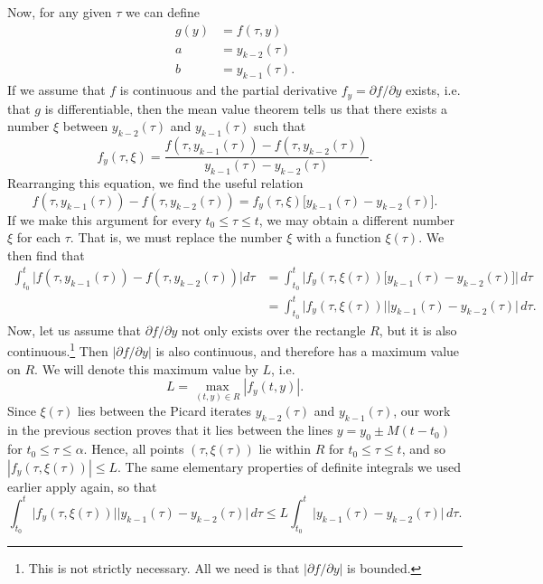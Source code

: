 \documentclass{myart}
\begin{document}
Now, for any given $\tau$ we can define
\begin{align*}
g(y) &= f(\tau, y) \\
a &= y_{k-2}(\tau) \\
b &= y_{k-1}(\tau).
\end{align*}
If we assume that $f$ is continuous and the partial derivative $f_y = \partial f/\partial y$ exists, i.e. that $g$ is differentiable, then the mean value theorem tells us that there exists a number $\xi$ between $y_{k-2}(\tau)$ and $y_{k-1}(\tau)$ such that
\begin{equation*}
f_y(\tau, \xi) = \frac{f(\tau, y_{k-1}(\tau)) - f(\tau, y_{k-2}(\tau))}{y_{k-1}(\tau) - y_{k-2}(\tau)}.
\end{equation*}
Rearranging this equation, we find the useful relation
\begin{equation*}
f(\tau, y_{k-1}(\tau)) - f(\tau, y_{k-2}(\tau)) = f_y(\tau, \xi)\big[y_{k-1}(\tau) - y_{k-2}(\tau)\big].
\end{equation*}
If we make this argument for every $t_0 \leq \tau \leq t$, we may obtain a different number $\xi$ for each $\tau$. That is, we must replace the number $\xi$ with a function $\xi(\tau)$. We then find that
\begin{align*}
\int_{t_0}^t \Big|f(\tau, y_{k-1}(\tau)) - f(\tau, y_{k-2}(\tau))\Big| d\tau &= \int_{t_0}^t \Big|f_y(\tau, \xi(\tau))\big[y_{k-1}(\tau) - y_{k-2}(\tau)\big]\Big| \,d\tau \\
&= \int_{t_0}^t \Big|f_y(\tau, \xi(\tau))\Big|\Big|y_{k-1}(\tau) - y_{k-2}(\tau)\Big| \,d\tau.
\end{align*}
Now, let us assume that $\partial f/\partial y$ not only exists over the rectangle $R$, but it is also continuous.\footnote{This is not strictly necessary. All we need is that $|\partial f/\partial y|$ is bounded.} Then $|\partial f/\partial y|$ is also continuous, and therefore has a maximum value on $R$. We will denote this maximum value by $L$, i.e.
\begin{equation*}
L = \max_{(t, y) \in R} |f_y(t, y)|.
\end{equation*}
Since $\xi(\tau)$ lies between the Picard iterates $y_{k-2}(\tau)$ and $y_{k-1}(\tau)$, our work in the previous section proves that it lies between the lines $y = y_0 \pm M(t - t_0)$ for $t_0 \leq \tau \leq \alpha$. Hence, all points $(\tau, \xi(\tau))$ lie within $R$ for $t_0 \leq \tau \leq t$, and so $|f_y(\tau, \xi(\tau))| \leq L$. The same elementary properties of definite integrals we used earlier apply again, so that
\begin{equation*}
\int_{t_0}^t \Big|f_y(\tau, \xi(\tau))\Big|\Big|y_{k-1}(\tau) - y_{k-2}(\tau)\Big| \,d\tau \leq L \int_{t_0}^t \Big|y_{k-1}(\tau) - y_{k-2}(\tau)\Big| \,d\tau.
\end{equation*}
\end{document}

